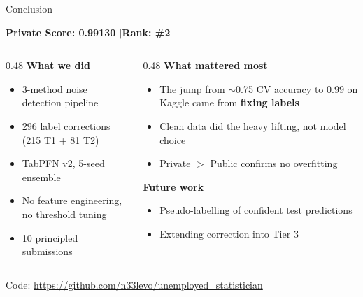 \documentclass[aspectratio=169, 11pt]{beamer}
\begin{document}
\begin{frame}{Conclusion}

\begin{center}
  {\Large\bfseries Private Score: 0.99130 \quad$\boldsymbol{\mid}$\quad Rank: \#2}
\end{center}

\vspace{0.5em}
\begin{columns}[T]
\begin{column}{0.48\textwidth}
  \textbf{What we did}
  \begin{itemize}
    \item 3-method noise detection pipeline
    \item 296 label corrections (215 T1 + 81 T2)
    \item TabPFN v2, 5-seed ensemble
    \item No feature engineering, no threshold tuning
    \item 10 principled submissions
  \end{itemize}
\end{column}
\begin{column}{0.48\textwidth}
  \textbf{What mattered most}
  \begin{itemize}
    \item The jump from $\sim$0.75 CV accuracy to 0.99 on Kaggle came from \textbf{fixing labels}
    \item Clean data did the heavy lifting, not model choice
    \item Private $>$ Public confirms no overfitting
  \end{itemize}

  \vspace{0.4em}
  \textbf{Future work}
  \begin{itemize}
    \item Pseudo-labelling of confident test predictions
    \item Extending correction into Tier 3
  \end{itemize}
\end{column}
\end{columns}

\vspace{0.8em}
\centering
{\small Code: \url{https://github.com/n33levo/unemployed_statistician}}
\end{frame}
\end{document}
